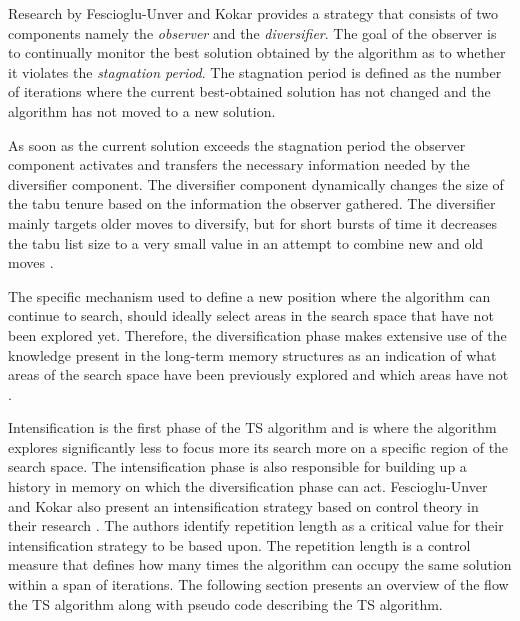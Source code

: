 Research by Fescioglu-Unver and Kokar \cite{SelfControllingReactiveTabu} provides a strategy that consists of two components namely the \emph{observer} and the \emph{diversifier}. The goal of the observer is to continually monitor the best solution obtained by the algorithm as to whether it violates the \emph{stagnation period}. The stagnation period is defined as the number of iterations where the current best-obtained solution has not changed and the algorithm has not moved to a new solution\cite{SelfControllingReactiveTabu}. 

As soon as the current solution exceeds the stagnation period the observer component activates and transfers the necessary information needed by the diversifier component. The diversifier component dynamically changes the size of the tabu tenure based on the information the observer gathered. The diversifier mainly targets older moves to diversify, but for short bursts of time it decreases the tabu list size to a very small value in an attempt to combine new and old moves \cite{SelfControllingReactiveTabu}.

The specific mechanism used to define a new position where the algorithm can continue to search, should ideally select areas in the search space that have not been explored yet\cite{NonlinearGlobalTabu,SelfControllingReactiveTabu}. Therefore, the diversification phase makes extensive use of the knowledge present in the long-term memory structures as an indication of what areas of the search space have been previously explored and which areas have not \cite{NonlinearGlobalTabu,SelfControllingReactiveTabu}.

Intensification is the first phase of the \gls{TS} algorithm and is where the algorithm explores significantly less to focus more its search more on a specific region of the search space. The intensification phase is also responsible for building up a history in memory on which the diversification phase can act. Fescioglu-Unver and Kokar also present an intensification strategy based on control theory in their research \cite{SelfControllingReactiveTabu}. The authors identify repetition length as a critical value for their intensification strategy to be based upon. The repetition length is a control measure that defines how many times the algorithm can occupy the same solution within a span of iterations. The following section presents an overview of the flow the \gls{TS} algorithm along with pseudo code describing the \gls{TS} algorithm.
